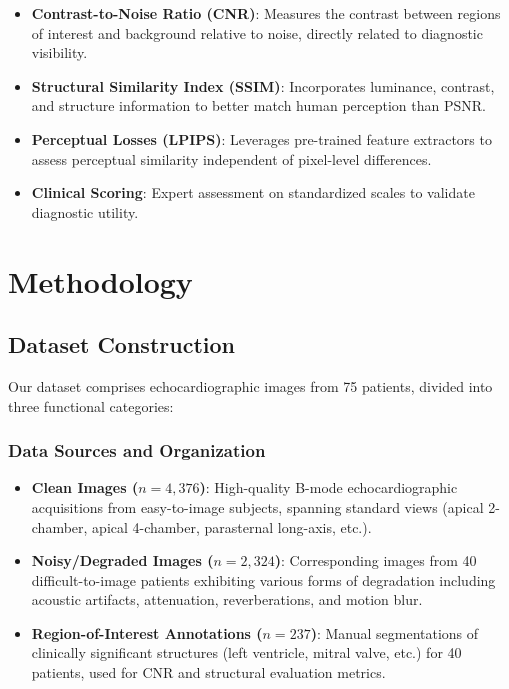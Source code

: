 \documentclass[10pt,conference,letterpaper]{IEEEtran}
\begin{document}
\begin{itemize}
  \item \textbf{Contrast-to-Noise Ratio (CNR)}: Measures the contrast between regions of interest and background relative to noise, directly related to diagnostic visibility.
  
  \item \textbf{Structural Similarity Index (SSIM)}: Incorporates luminance, contrast, and structure information to better match human perception than PSNR.
  
  \item \textbf{Perceptual Losses (LPIPS)}: Leverages pre-trained feature extractors to assess perceptual similarity independent of pixel-level differences.
  
  \item \textbf{Clinical Scoring}: Expert assessment on standardized scales to validate diagnostic utility.
\end{itemize}

\section{Methodology}
\label{sec:methodology}

\subsection{Dataset Construction}
\label{subsec:dataset}

Our dataset comprises echocardiographic images from 75 patients, divided into three functional categories:

\subsubsection{Data Sources and Organization}

\begin{itemize}
  \item \textbf{Clean Images ($n = 4,376$)}: High-quality B-mode echocardiographic acquisitions from easy-to-image subjects, spanning standard views (apical 2-chamber, apical 4-chamber, parasternal long-axis, etc.).
  
  \item \textbf{Noisy/Degraded Images ($n = 2,324$)}: Corresponding images from 40 difficult-to-image patients exhibiting various forms of degradation including acoustic artifacts, attenuation, reverberations, and motion blur.
  
  \item \textbf{Region-of-Interest Annotations ($n = 237$)}: Manual segmentations of clinically significant structures (left ventricle, mitral valve, etc.) for 40 patients, used for CNR and structural evaluation metrics.
\end{itemize}
\end{document}

